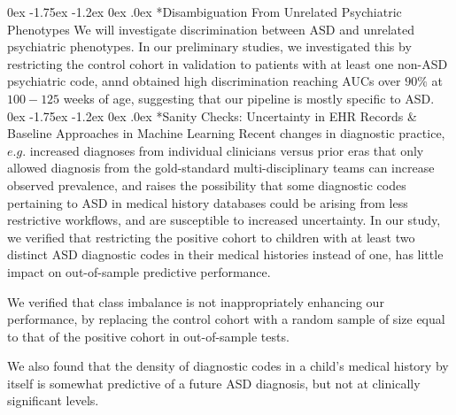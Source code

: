 \documentclass[onecolumn, compsoc,11pt]{IEEEtran}
\makeatletter
\renewcommand\subsection{\@startsection {subsection}{2}{\z@}%
                                   {0ex \@plus -1.75ex \@minus -1.2ex}%
                                   {0ex \@plus.0ex}%
                                   {\fontsize{11}{11}\selectfont\bfseries\sffamily\color{black}}}
\def\treatment{positive\xspace}
\makeatother
\begin{document}
\subsection*{Disambiguation From Unrelated Psychiatric Phenotypes}
%
 We will investigate  discrimination between ASD and  unrelated psychiatric phenotypes. In our preliminary studies, we  investigated this by restricting the  control  cohort in validation to  patients with at least one non-ASD psychiatric code, annd obtained  high discrimination reaching AUCs over $90\%$ at $100-125$ weeks of age, suggesting that our pipeline is  mostly specific to ASD.
%
\subsection*{Sanity Checks: Uncertainty in EHR Records \& Baseline Approaches in Machine Learning}
Recent changes in diagnostic practice, $e.g.$ increased diagnoses from individual clinicians versus prior eras that only allowed diagnosis from the gold-standard multi-disciplinary teams can  increase observed   prevalence, and  raises the possibility that  some diagnostic codes pertaining to ASD in medical history databases could be arising from less restrictive workflows, and  are susceptible to increased uncertainty.  In our study, we verified that restricting the \treatment cohort to children with at least two  distinct ASD diagnostic codes in their medical histories instead of one, has little impact on  out-of-sample predictive performance.
 
We  verified that class imbalance is not inappropriately  enhancing our performance, by replacing  the  control cohort with a random sample of size equal to that of the \treatment cohort in out-of-sample tests.

We also found that the density of diagnostic codes in a child's medical history by itself is somewhat predictive of a future ASD diagnosis, but not at clinically significant levels.
\end{document}
